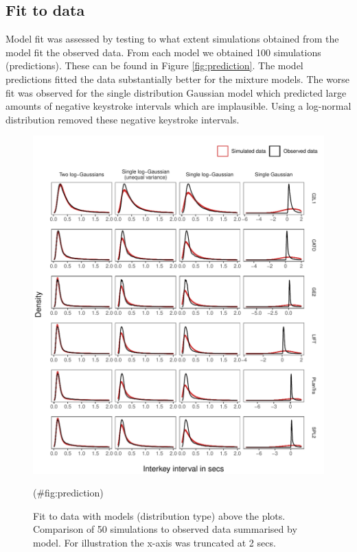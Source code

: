 \clearpage
\makeatletter
\efloat@restorefloats
\makeatother


\begin{appendix}
\section{}
\hypertarget{fit-to-data}{%
\subsection{Fit to data}\label{fit-to-data}}

Model fit was assessed by testing to what extent simulations obtained
from the model fit the observed data. From each model we obtained 100
simulations (predictions). These can be found in Figure
\ref{fig:prediction}. The model predictions fitted the data
substantially better for the mixture models. The worse fit was observed
for the single distribution Gaussian model which predicted large amounts
of negative keystroke intervals which are implausible. Using a
log-normal distribution removed these negative keystroke intervals.

\begin{figure}

{\centering \includegraphics{figures/fitplots} 

}

\caption{Fit to data with models (distribution type) above the plots. Comparison of 50 simulations to observed data summarised by model. For illustration the x-axis was truncated at 2 secs.}(\#fig:prediction)
\end{figure}
\end{appendix}
